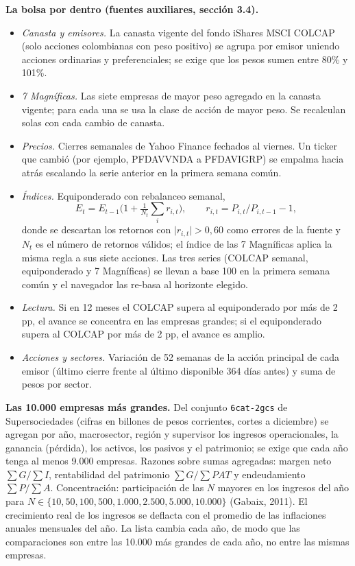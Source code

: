 \textbf{La bolsa por dentro (fuentes auxiliares, sección 3.4).}

\begin{itemize}
\tightlist
\item
  \emph{Canasta y emisores.} La canasta vigente del fondo iShares MSCI
  COLCAP (solo acciones colombianas con peso positivo) se agrupa por
  emisor uniendo acciones ordinarias y preferenciales; se exige que los
  pesos sumen entre 80\% y 101\%.
\item
  \emph{7 Magníficas.} Las siete empresas de mayor peso agregado en la
  canasta vigente; para cada una se usa la clase de acción de mayor
  peso. Se recalculan solas con cada cambio de canasta.
\item
  \emph{Precios.} Cierres semanales de Yahoo Finance fechados al
  viernes. Un ticker que cambió (por ejemplo, PFDAVVNDA a PFDAVIGRP) se
  empalma hacia atrás escalando la serie anterior en la primera semana
  común.
\item
  \emph{Índices.} Equiponderado con rebalanceo semanal,
  \[E_t = E_{t-1}\Big(1+\tfrac{1}{N_t}\textstyle\sum_{i} r_{i,t}\Big),\qquad r_{i,t}=P_{i,t}/P_{i,t-1}-1,\]
  donde se descartan los retornos con \(\lvert r_{i,t}\rvert>0{,}60\)
  como errores de la fuente y \(N_t\) es el número de retornos válidos;
  el índice de las 7 Magníficas aplica la misma regla a sus siete
  acciones. Las tres series (COLCAP semanal, equiponderado y 7
  Magníficas) se llevan a base 100 en la primera semana común y el
  navegador las re-basa al horizonte elegido.
\item
  \emph{Lectura.} Si en 12 meses el COLCAP supera al equiponderado por
  más de 2 pp, el avance se concentra en las empresas grandes; si el
  equiponderado supera al COLCAP por más de 2 pp, el avance es amplio.
\item
  \emph{Acciones y sectores.} Variación de 52 semanas de la acción
  principal de cada emisor (último cierre frente al último disponible
  364 días antes) y suma de pesos por sector.
\end{itemize}

\textbf{Las 10.000 empresas más grandes.} Del conjunto
\texttt{6cat-2gcs} de Supersociedades (cifras en billones de pesos
corrientes, cortes a diciembre) se agregan por año, macrosector, región
y supervisor los ingresos operacionales, la ganancia (pérdida), los
activos, los pasivos y el patrimonio; se exige que cada año tenga al
menos 9.000 empresas. Razones sobre sumas agregadas: margen neto
\(\sum G/\sum I\), rentabilidad del patrimonio \(\sum G/\sum PAT\) y
endeudamiento \(\sum P/\sum A\). Concentración: participación de las
\(N\) mayores en los ingresos del año para
\(N\in\{10,50,100,500,1.000,2.500,5.000,10.000\}\) (Gabaix, 2011). El
crecimiento real de los ingresos se deflacta con el promedio de las
inflaciones anuales mensuales del año. La lista cambia cada año, de modo
que las comparaciones son entre las 10.000 más grandes de cada año, no
entre las mismas empresas.

